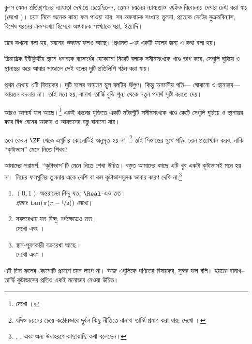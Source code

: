 \documentclass[../../../include/open-logic-section]{subfiles}
\begin{document}

বুলস যেমন প্রতিস্থাপনের ন্যায্যতা দেখাতে
চেয়েছিলেন, তেমন চয়নের ন্যায্যতাও
\emph{বাহ্যিক} বিবেচনায় দেখার চেষ্টা করা যায়
(দেখো )।
চয়ন নিলে অনেক কাম্য ফল পাওয়া যায়:
সব অঙ্কবাচক সংখ্যার তুলনা, প্রত্যেক সেটের
সুক্রমবিন্যাস, বিশেষ ধরনের ক্রমসংখ্যা হিসেবে
অঙ্কবাচক সংখ্যাকে ধরা, ইত্যাদি।

তবে কখনো বলা হয়, চয়নের \emph{অকাম্য} ফলও
আছে। প্রধানত \cite{BanachTarski1924}-এর
একটি ফলের জন্য এ কথা বলা হয়।

\begin{thm}[বানাখ--তার্স্কি কূটাভাস ($\ZFC$-এ)]
ত্রিমাত্রিক ইউক্লিডীয় স্থানে ধনাত্মক ব্যাসার্ধের
যেকোনো নিরেট বলকে সসীমসংখ্যক খণ্ডে ভাগ করে,
সেগুলি ঘুরিয়ে ও স্থানান্তর করে আবার সাজালে
সেই বলের দুটি প্রতিলিপি গঠন করা যায়।
\end{thm}
\noindent
প্রথম দেখায় এটি বিস্ময়কর। দুটি বলের আয়তন
মূল বলটির \emph{দ্বিগুণ}। কিন্তু অনমনীয় গতি—
ঘোরানো ও স্থানান্তর—আয়তন বদলায় না। তাই
মনে হয়, বানাখ--তার্স্কি বুঝি শূন্য থেকে নতুন
পদার্থ সৃষ্টি করতে দেয়।

আরও আশ্চর্য ফল আছে।\footnote{দেখো
\citet[Theorem 3.12]{Wagon2016}।}
একই ধরনের যুক্তিতে একটি মটরশুঁটি সসীমসংখ্যক
খণ্ডে কেটে সেগুলি ঘুরিয়ে ও স্থানান্তর করে
বিগ বেনের আকার ও আয়তনের বস্তু বানানো যায়।

তবে কেবল $\ZF$ থেকে এগুলির কোনোটিই
অনুসৃত হয় না।\footnote{যদিও চয়নের চেয়ে
কঠোরভাবে দুর্বল কিছু নীতিতে বানাখ--তার্স্কি
প্রমাণ করা যায়; দেখো \citet[303]{Wagon2016}।}
তাই সিদ্ধান্তের মুখে পড়ি: চয়ন প্রত্যাখ্যান করব,
নাকি ``কূটাভাস'' মেনে নিতে শিখব?

আমাদের পরামর্শ, ``কূটাভাস''টি মেনে নিতে
শেখা উচিত। বস্তুত আমাদের কাছে এটি খুব একটা
কূটাভাসই মনে হয় না। নিচের ফলগুলির তুলনায়
একে বেশি বা কম কূটাভাসমূলক ভাবার কারণ
দেখি না:\footnote{\citet[276--7]{Potter2004},
\citet[16]{Weston2003}, এবং
\citet[31, 308--9]{Wagon2016} অন্য
উদাহরণে কাছাকাছি কথা বলেছেন।}
\begin{enumerate}
	\item $(0,1)$ অন্তরালের বিন্দু যত, $\Real$-এও তত।
	\\\emph{প্রমাণ}: $\tan(\pi(r-\nicefrac{1}{2}))$ দেখো।
	\item সরলরেখায় যত বিন্দু, বর্গক্ষেত্রেও তত।
	\\দেখো  এবং
	।
	\item স্থান-পূরণকারী বক্ররেখা আছে।
	\\দেখো  এবং
	।
\end{enumerate}
এই তিন ফলের কোনোটি প্রমাণে চয়ন লাগে না।
আজ এগুলিকে গণিতের বিস্ময়কর, সুন্দর ফল
বলি। হয়তো বানাখ--তার্স্কি কূটাভাসের
প্রতিও একই মনোভাব নেওয়া উচিত।
\end{document}
